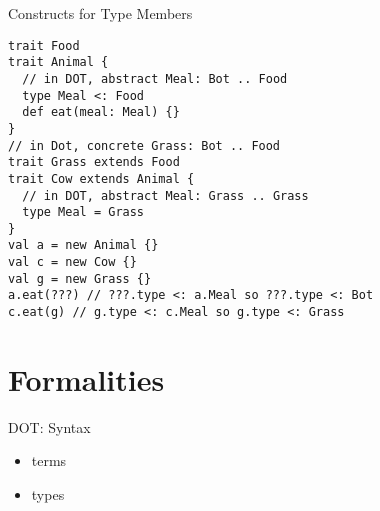 \documentclass{beamer}
\begin{document}
\begin{frame}[fragile]{Constructs for Type Members}
\begin{verbatim}
trait Food
trait Animal {
  // in DOT, abstract Meal: Bot .. Food
  type Meal <: Food
  def eat(meal: Meal) {}
}
// in Dot, concrete Grass: Bot .. Food
trait Grass extends Food
trait Cow extends Animal {
  // in DOT, abstract Meal: Grass .. Grass
  type Meal = Grass
}
val a = new Animal {}
val c = new Cow {}
val g = new Grass {}
a.eat(???) // ???.type <: a.Meal so ???.type <: Bot
c.eat(g) // g.type <: c.Meal so g.type <: Grass
\end{verbatim}
\end{frame}

\section{Formalities}

\begin{frame}[fragile]{DOT: Syntax}
\begin{itemize}
\item terms
\item types
\end{itemize}
\end{frame}
\end{document}
